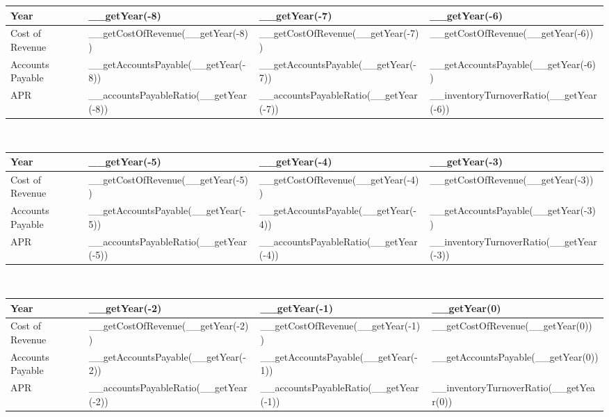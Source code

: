 \begin{tabularx}{\textwidth}{|X|X|X|X|}
 \hline
 Year                     & __getYear(-8)                         & __getYear(-7)                         & __getYear(-6)                           \\
 \hline
 Cost of Revenue          & __getCostOfRevenue(__getYear(-8))     & __getCostOfRevenue(__getYear(-7))     & __getCostOfRevenue(__getYear(-6))       \\
 Accounts Payable         & __getAccountsPayable(__getYear(-8))   & __getAccountsPayable(__getYear(-7))   & __getAccountsPayable(__getYear(-6))     \\
 \rowcolor{lightgray} APR & __accountsPayableRatio(__getYear(-8)) & __accountsPayableRatio(__getYear(-7)) & __inventoryTurnoverRatio(__getYear(-6)) \\
 \hline
\end{tabularx}\\

\begin{tabularx}{\textwidth}{|X|X|X|X|}
 \hline
 Year                     & __getYear(-5)                         & __getYear(-4)                         & __getYear(-3)                           \\
 \hline
 Cost of Revenue          & __getCostOfRevenue(__getYear(-5))     & __getCostOfRevenue(__getYear(-4))     & __getCostOfRevenue(__getYear(-3))       \\
 Accounts Payable         & __getAccountsPayable(__getYear(-5))   & __getAccountsPayable(__getYear(-4))   & __getAccountsPayable(__getYear(-3))     \\
 \rowcolor{lightgray} APR & __accountsPayableRatio(__getYear(-5)) & __accountsPayableRatio(__getYear(-4)) & __inventoryTurnoverRatio(__getYear(-3)) \\
 \hline
\end{tabularx}\\

\begin{tabularx}{\textwidth}{|X|X|X|X|}
 \hline
 Year                     & __getYear(-2)                         & __getYear(-1)                         & __getYear(0)                           \\
 \hline
 Cost of Revenue          & __getCostOfRevenue(__getYear(-2))     & __getCostOfRevenue(__getYear(-1))     & __getCostOfRevenue(__getYear(0))       \\
 Accounts Payable         & __getAccountsPayable(__getYear(-2))   & __getAccountsPayable(__getYear(-1))   & __getAccountsPayable(__getYear(0))     \\
 \rowcolor{lightgray} APR & __accountsPayableRatio(__getYear(-2)) & __accountsPayableRatio(__getYear(-1)) & __inventoryTurnoverRatio(__getYear(0)) \\
 \hline
\end{tabularx}

